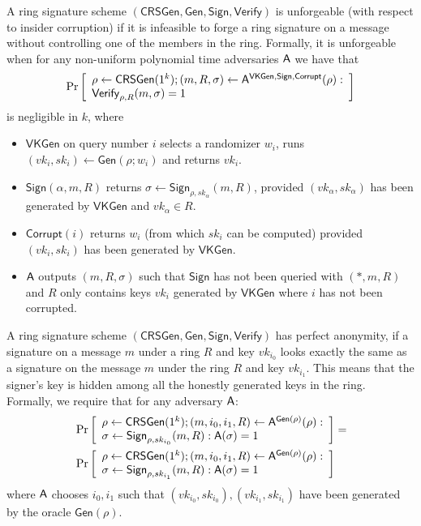 \begin{definition}
A ring signature scheme $(\mathsf{CRSGen}, \mathsf{Gen}, \mathsf{Sign}, \mathsf{Verify})$
is unforgeable (with respect to insider corruption) if it is infeasible to forge a ring
signature on a message without controlling one of the members in the ring. Formally, it
is unforgeable when for any non-uniform polynomial
time adversaries $\mathsf{A}$ we have that
$$
\Pr\left[\begin{array}{l}
\rho\gets\mathsf{CRSGen}(1^k);(m,R,\sigma)\gets\mathsf{A}^{\mathsf{VKGen},\mathsf{Sign},\mathsf{Corrupt}}(\rho):\\
\mathsf{Verify}_{\rho,R}(m,\sigma)=1
\end{array}\right]
$$
is negligible in $k$, where

\begin{itemize}
\item $\mathsf{VKGen}$ on query number $i$ selects a randomizer $w_i$, runs $(vk_i,sk_i) \gets \mathsf{Gen}(\rho; w_i)$
and returns $vk_i$.
\item $\mathsf{Sign}(\alpha, m, R)$ returns $\sigma \gets \mathsf{Sign}_{\rho,sk_\alpha}(m, R)$, provided $(vk_\alpha, sk_\alpha)$ has been generated
by $\mathsf{VKGen}$ and $vk_\alpha\in R$.
\item $\mathsf{Corrupt}(i)$ returns $w_i$ (from which $sk_i$ can be computed) provided $(vk_i, sk_i)$ has
been generated by $\mathsf{VKGen}$.
\item $\mathsf{A}$ outputs $(m, R, \sigma)$ such that $\mathsf{Sign}$ has not been queried with $(*, m, R)$ and $R$
only contains keys $vk_i$ generated by $\mathsf{VKGen}$ where $i$ has not been corrupted.
\end{itemize}
\end{definition}

\begin{definition}
A ring signature scheme
$(\mathsf{CRSGen}, \mathsf{Gen}, \mathsf{Sign}, \mathsf{Verify})$ has perfect anonymity, if a signature on a message
$m$ under a ring $R$ and key $vk_{i_0}$
looks exactly the same as a signature on the
message $m$ under the ring $R$ and key $vk_{i_1}$. This means that the signer's key is hidden
among all the honestly generated keys in the ring. Formally, we require that for any
adversary $\mathsf{A}$:
\begin{align*}
&\Pr\left[\begin{array}{l}
\rho\gets\mathsf{CRSGen}(1^k);(m,i_0,i_1,R)\gets\mathsf{A}^{\mathsf{Gen}(\rho)}(\rho):\\
\sigma\gets\mathsf{Sign}_{\rho,sk_{i_0}}(m,R):\mathsf{A}(\sigma)=1
\end{array}\right]
=\\
&\Pr\left[\begin{array}{l}
\rho\gets\mathsf{CRSGen}(1^k);(m,i_0,i_1,R)\gets\mathsf{A}^{\mathsf{Gen}(\rho)}(\rho):\\
\sigma\gets\mathsf{Sign}_{\rho,sk_{i_1}}(m,R):\mathsf{A}(\sigma)=1
\end{array}\right]
\end{align*}
where $\mathsf{A}$ chooses $i_0, i_1$ such that $(vk_{i_0}, sk_{i_0}),(vk_{i_1}, sk_{i_1})$ have been generated by the
oracle $\mathsf{Gen(\rho)}$.
\end{definition}

